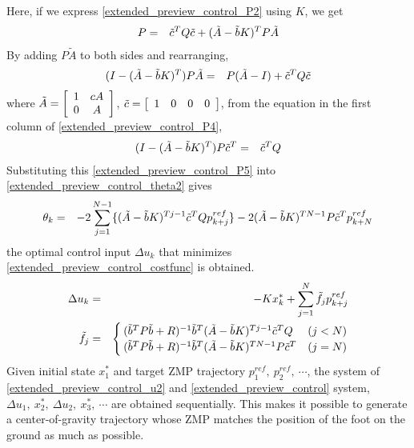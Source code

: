 Here, if we express \eqref{extended_preview_control_P2} using $K$, we get 
\begin{eqnarray}
  P &=& \tilde{c}^T Q \tilde{c} + (\tilde{A} - \tilde{b} K)^T P \tilde{A} \eqlabel{extended_preview_control_P3}
\end{eqnarray}
By adding $P \tilde{A}$ to both sides and rearranging,
\begin{eqnarray}
  (I - (\tilde{A} - \tilde{b} K)^{T}) P \tilde{A} &=& P (\tilde{A} - I) + \tilde{c}^T Q \tilde{c} \eqlabel{extended_preview_control_P4}
\end{eqnarray}
where $\tilde{A} = \left[\begin{array}{c c} 1 & cA\\ 0 & A \end{array} \right]$, $\tilde{c} = \left[\begin{array}{c c c c} 1 & 0 & 0 & 0 \end{array} \right]$, from the equation in the first column of \eqref{extended_preview_control_P4},
\begin{eqnarray}
  (I - (\tilde{A} - \tilde{b} K)^{T}) P \tilde{c}^T &=& \tilde{c}^T Q \eqlabel{extended_preview_control_P5}
\end{eqnarray}
Substituting this \eqref{extended_preview_control_P5} into \eqref{extended_preview_control_theta2} gives
\begin{eqnarray}
  \theta_k &=& -2 \sum_{j=1}^{N-1} \{ (\tilde{A} - \tilde{b} K)^{T j-1} \tilde{c}^T Q p_{k+j}^{ref} \} -2 (\tilde{A} - \tilde{b} K)^{T N-1} P \tilde{c}^T p_{k+N}^{ref} \eqlabel{extended_preview_control_theta3}
\end{eqnarray}
the optimal control input $\Delta u_k$ that minimizes \eqref{extended_preview_control_costfunc} is obtained.
\begin{eqnarray}
  \Delta u_k &=& -K x_k^\ast + \sum_{j=1}^N \tilde{f}_j p_{k+j}^{ref}\eqlabel{extended_preview_control_u2}\\
  \tilde{f}_j &=& \begin{cases}
    (\tilde{b}^T P \tilde{b} + R )^{-1} \tilde{b}^T (\tilde{A} - \tilde{b} K)^{T j-1} \tilde{c}^T Q & (j<N) \\
    (\tilde{b}^T P \tilde{b} + R )^{-1} \tilde{b}^T (\tilde{A} - \tilde{b} K)^{T N-1} P \tilde{c}^T & (j=N)
  \end{cases}\nonumber
\end{eqnarray}
Given initial state $x_1^\ast$ and target ZMP trajectory $p_{1}^{ref},~p_{2}^{ref},~\cdots$, the system of \eqref{extended_preview_control_u2} and \eqref{extended_preview_control} system, $\Delta u_1,~x_2^\ast,~\Delta u_2,~x_3^\ast,~\cdots$ are obtained sequentially. This makes it possible to generate a center-of-gravity trajectory whose ZMP matches the position of the foot on the ground as much as possible.

